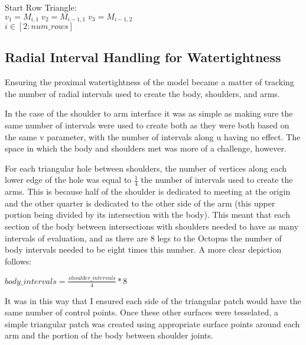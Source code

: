 \documentclass[twocolumn]{article}
\begin{document}
\vspace{2mm}
\begin{flushleft}
Start Row Triangle:\\
\hspace{18mm}$v_1 = M_{i,1} \; v_2= M_{i-1,1} \; v_3 = M_{i-1,2} $ \\
\hspace{18mm}$ i \in [2:num\_rows]$ \\
\end{flushleft}
\vspace{2mm}

\subsection{Radial Interval Handling for Watertightness}

Ensuring the proximal watertightness of the model became a matter of tracking the number of radial intervals used to create the body, shoulders, and arms.

In the case of the shoulder to arm interface it was as simple as making sure the same number of intervals were used to create both as they were both based on the same v parameter, with the number of intervals along u having no effect. The space in which the body and shoulders met was more of a challenge, however.

For each triangular hole between shoulders, the number of vertices along each lower edge of the hole was equal to $\frac{1}{4}$ the number of intervals used to create the arms. This is because half of the shoulder is dedicated to meeting at the origin and the other quarter is dedicated to the other side of the arm (this upper portion being divided by its intersection with the body). This meant that each section of the body between intersections with shoulders needed to have as many intervals of evaluation, and as there are 8 legs to the Octopus the number of body intervals needed to be eight times this number. A more clear depiction follows:

\begin{center}
$body\_intervals = \frac{shoulder\_intervals}{4} * 8 $ 
\end{center}


It was in this way that I ensured each side of the triangular patch would have the same number of control points. Once these other surfaces were tesselated, a simple triangular patch was created using appropriate surface points around each arm and the portion of the body between shoulder joints. 
\end{document}
